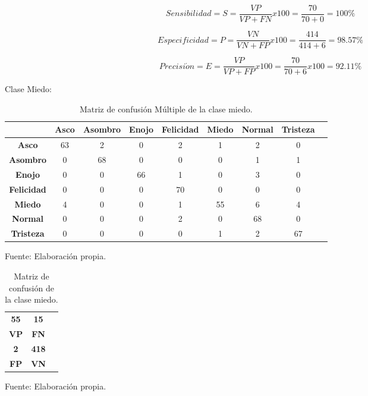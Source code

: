 \begin{equation}
Sensibilidad=S=\frac{VP}{VP+FN}x100=\frac{70}{70+0}=100\%
\end{equation}

\begin{equation}
Especificidad=P=\frac{VN}{VN+FP}x100=\frac{414}{414+6}=98.57\%
\end{equation}

\begin{equation}
Precisi\acute{o}n=E=\frac{VP}{VP+FP}x100=\frac{70}{70+6}x100=92.11\%
\end{equation}

\vskip 5cm

Clase Miedo:

\begin{table}[ht!]
\centering
\caption{Matriz de confusión Múltiple de la clase miedo.} \vskip 0.1cm
\begin{tabular}{|c|c|c|c|c|c|c|c|c|} \hline
 & \bf Asco & \bf Asombro & \bf Enojo & \bf Felicidad & \bf Miedo & \bf Normal & \bf Tristeza \\ \hline
\bf Asco & 63 & 2 & 0 & 2 & 1 & 2 & 0 \\ \hline
\bf Asombro & 0 & 68 & 0 & 0 & 0 & 1 & 1 \\ \hline
\bf Enojo & 0 & 0 & 66 & 1 & 0 & 3 & 0 \\ \hline
\bf Felicidad & 0 & 0 & 0 & 70 & 0 & 0 & 0 \\ \hline
\bf Miedo & 4 & 0 & 0 & 1 & 55 & 6 & 4 \\ \hline
\bf Normal & 0 & 0 & 0 & 2 & 0 & 68 & 0 \\ \hline
\bf Tristeza & 0 & 0 & 0 & 0 & 1 & 2 & 67 \\ \hline

\end{tabular}
\begin{center}
{\small{Fuente: Elaboración propia.}}
\end{center}
\end{table}

\begin{table}[ht!]
\centering
\caption{Matriz de confusión de la clase miedo.} \vskip 0.1cm
\begin{tabular}{|c|c|c|} \hline
\bf 55 \par & \bf 15 \par \\
\bf VP & \bf FN \\ \hline
\bf 2 \par & \bf 418 \par \\ 
\bf FP & \bf VN \\ \hline 
\end{tabular}
\begin{center}
{\small{Fuente: Elaboración propia.}}
\end{center}
\end{table}

